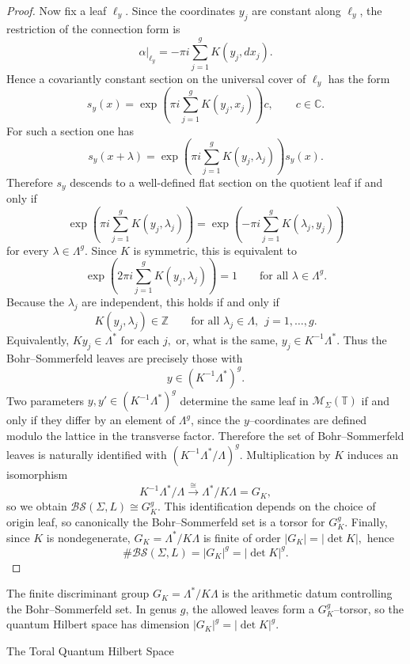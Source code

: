 \documentclass[12pt]{amsart}
\makeatletter
\renewcommand\subsection{\@startsection{subsection}{2}%
  \z@{.5\linespacing\@plus.7\linespacing}{-.5em}%
  {\normalfont\bfseries}}
\numberwithin{equation}{section}
\makeatother
\begin{document}
\begin{proof}
Now fix a leaf \(\ell_y\). Since the coordinates \(y_j\) are constant along \(\ell_y\), the
restriction of the connection form is
\[
\alpha|_{\ell_y}=-\pi i\sum_{j=1}^g K(y_j,dx_j).
\]
Hence a covariantly constant section on the universal cover of \(\ell_y\) has the form
\[
s_y(x)=
\exp\!\left(\pi i\sum_{j=1}^g K(y_j,x_j)\right)c,
\qquad c\in \mathbb C.
\]
For such a section one has
\[
s_y(x+\lambda)
=
\exp\!\left(\pi i\sum_{j=1}^g K(y_j,\lambda_j)\right)s_y(x).
\]
Therefore \(s_y\) descends to a well-defined flat section on the quotient leaf if and only if
\[
\exp\!\left(\pi i\sum_{j=1}^g K(y_j,\lambda_j)\right)
=
\exp\!\left(-\pi i\sum_{j=1}^g K(\lambda_j,y_j)\right)
\]
for every \(\lambda\in\Lambda^g\). Since \(K\) is symmetric, this is equivalent to
\[
\exp\!\left(2\pi i\sum_{j=1}^g K(y_j,\lambda_j)\right)=1
\qquad\text{for all }\lambda\in\Lambda^g.
\]
Because the \(\lambda_j\) are independent, this holds if and only if
\[
K(y_j,\lambda_j)\in\mathbb Z
\qquad\text{for all }\lambda_j\in\Lambda,\ \ j=1,\dots,g.
\]
Equivalently, $Ky_j\in\Lambda^*\text{ for each }j,$ or, what is the same, $y_j\in K^{-1}\Lambda^*.$ Thus the Bohr--Sommerfeld leaves are precisely those with
\[
y\in (K^{-1}\Lambda^*)^g.
\]
Two parameters $y,y'\in (K^{-1}\Lambda^*)^g$ determine the same leaf in $\mathcal M_\Sigma(\mathbb T)$ if and only if
they differ by an element of $\Lambda^g$, since the $y$--coordinates are defined modulo the lattice in the
transverse factor. Therefore the set of Bohr--Sommerfeld leaves is naturally identified with $(K^{-1}\Lambda^*/\Lambda)^g.$ Multiplication by $K$ induces an isomorphism
\[
K^{-1}\Lambda^*/\Lambda \xrightarrow{\ \cong\ } \Lambda^*/K\Lambda = G_K,
\]
so we obtain $\mathcal{BS}(\Sigma,L)\cong G_K^g.$
This identification depends on the choice of origin leaf, so canonically the Bohr--Sommerfeld set is a
torsor for $G_K^g$. Finally, since $K$ is nondegenerate, $G_K=\Lambda^*/K\Lambda$ is finite of order $|G_K|=|\det K|,$ hence
\[
\#\mathcal{BS}(\Sigma,L)=|G_K|^g=|\det K|^g.
\]
\end{proof}

The finite discriminant group $G_K=\Lambda^*/K\Lambda$ is the arithmetic datum controlling the
Bohr--Sommerfeld set. In genus $g$, the allowed leaves form a $G_K^g$--torsor, so the quantum Hilbert
space has dimension $|G_K|^g=|\det K|^g$.

\subsection{The Toral Quantum Hilbert Space}
\end{document}
